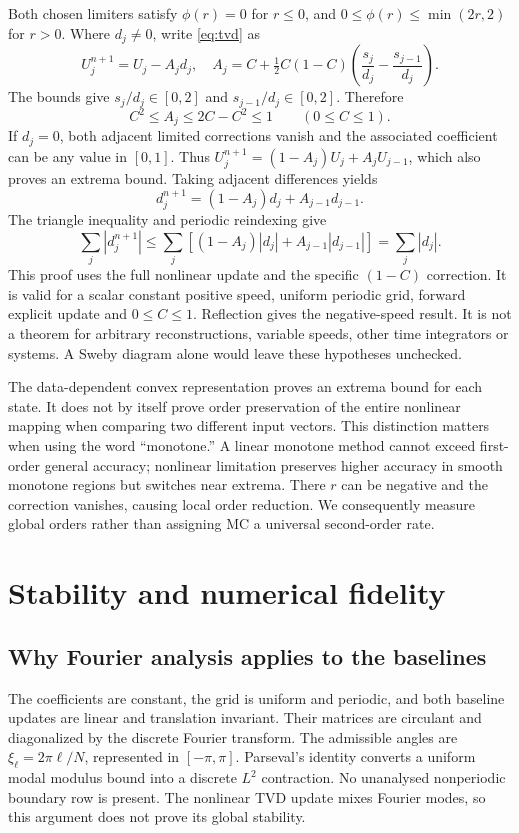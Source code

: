 Both chosen limiters satisfy $\phi(r)=0$ for $r\le0$, and $0\le\phi(r)\le\min(2r,2)$ for $r>0$. Where $d_j\ne0$, write \eqref{eq:tvd} as
\begin{equation}
 U_j^{n+1}=U_j-A_jd_j,\quad
 A_j=C+\tfrac12C(1-C)\left(\frac{s_j}{d_j}-\frac{s_{j-1}}{d_j}\right).
\end{equation}
The bounds give $s_j/d_j\in[0,2]$ and $s_{j-1}/d_j\in[0,2]$. Therefore
\begin{equation}
 C^2\le A_j\le2C-C^2\le1\qquad(0\le C\le1).
\end{equation}
If $d_j=0$, both adjacent limited corrections vanish and the associated coefficient can be any value in $[0,1]$. Thus $U_j^{n+1}=(1-A_j)U_j+A_j U_{j-1}$, which also proves an extrema bound. Taking adjacent differences yields
\begin{equation}
 d_j^{n+1}=(1-A_j)d_j+A_{j-1}d_{j-1}.
\end{equation}
The triangle inequality and periodic reindexing give
\begin{equation}
 \sum_j|d_j^{n+1}|\le\sum_j[(1-A_j)|d_j|+A_{j-1}|d_{j-1}|]=\sum_j|d_j|.
\end{equation}
This proof uses the full nonlinear update and the specific $(1-C)$ correction. It is valid for a scalar constant positive speed, uniform periodic grid, forward explicit update and $0\le C\le1$. Reflection gives the negative-speed result. It is not a theorem for arbitrary reconstructions, variable speeds, other time integrators or systems. A Sweby diagram alone would leave these hypotheses unchecked.

The data-dependent convex representation proves an extrema bound for each state. It does not by itself prove order preservation of the entire nonlinear mapping when comparing two different input vectors. This distinction matters when using the word ``monotone.'' A linear monotone method cannot exceed first-order general accuracy; nonlinear limitation preserves higher accuracy in smooth monotone regions but switches near extrema. There $r$ can be negative and the correction vanishes, causing local order reduction. We consequently measure global orders rather than assigning MC a universal second-order rate.

\section{Stability and numerical fidelity}
\subsection{Why Fourier analysis applies to the baselines}
The coefficients are constant, the grid is uniform and periodic, and both baseline updates are linear and translation invariant. Their matrices are circulant and diagonalized by the discrete Fourier transform. The admissible angles are $\xi_\ell=2\pi\ell/N$, represented in $[-\pi,\pi]$. Parseval's identity converts a uniform modal modulus bound into a discrete $L^2$ contraction. No unanalysed nonperiodic boundary row is present. The nonlinear TVD update mixes Fourier modes, so this argument does not prove its global stability.

